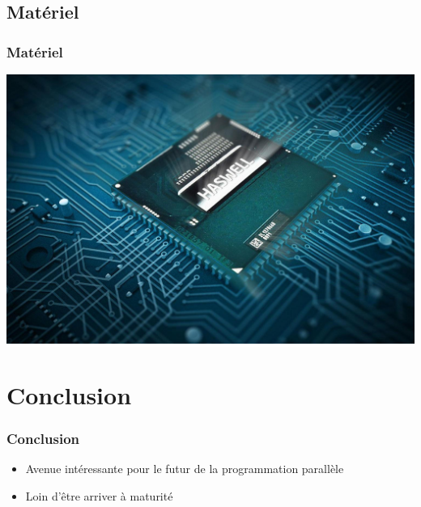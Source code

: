 \documentclass{beamer}
\begin{document}
\subsection{Matériel}
\begin{frame}
\frametitle{Matériel}
\begin{center}
\colorbox{white}{\includegraphics[scale=0.15]{haswell.jpg}}
\end{center}
\end{frame}

\section{Conclusion}
\begin{frame}
\frametitle{Conclusion}
\begin{itemize}
\item Avenue intéressante pour le futur de la programmation parallèle
\item<2-> Loin d'être arriver à maturité
\end{itemize}
\end{frame}
\end{document}
